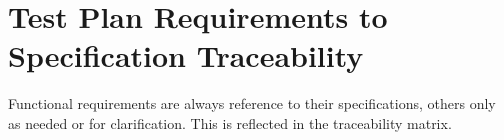 \chapter{Test Plan Requirements to Specification Traceability}

\noindent
Functional requirements are always reference to their specifications, others
only as needed or for clarification. This is reflected in the traceability
matrix.

\traceabilitymatrix



